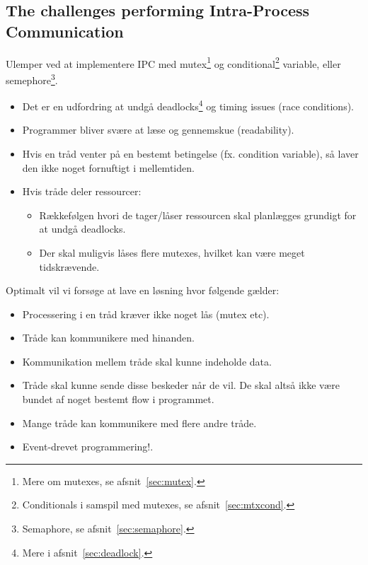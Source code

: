 \subsection{The challenges performing Intra-Process Communication}\label{sec:ipc}
Ulemper ved at implementere IPC med mutex\footnote{Mere om mutexes, se afsnit~\ref{sec:mutex}.} og conditional\footnote{Conditionals i samspil med mutexes, se afsnit~\ref{sec:mtxcond}.} variable, eller semephore\footnote{Semaphore, se afsnit~\ref{sec:semaphore}.}.

\begin{itemize}
	\item Det er en udfordring at undgå deadlocks\footnote{Mere i afsnit~\ref{sec:deadlock}.} og timing issues (race conditions).
	\item Programmer bliver svære at læse og gennemskue (readability).
	\item Hvis en tråd venter på en bestemt betingelse (fx. condition variable), så laver den ikke noget fornuftigt i mellemtiden.
	\item Hvis tråde deler ressourcer:
	\begin{itemize}
		\item Rækkefølgen hvori de tager/låser ressourcen skal planlægges grundigt for at undgå deadlocks.
		\item Der skal muligvis låses flere mutexes, hvilket kan være meget tidskrævende.
	\end{itemize}
\end{itemize}

Optimalt vil vi forsøge at lave en løsning hvor følgende gælder:

\begin{itemize}
	\item Processering i en tråd kræver ikke noget lås (mutex etc). 
	\item Tråde kan kommunikere med hinanden.
	\item Kommunikation mellem tråde skal kunne indeholde data.
	\item Tråde skal kunne sende disse beskeder når de vil. De skal altså ikke være bundet af noget bestemt flow i programmet.
	\item Mange tråde kan kommunikere med flere andre tråde.
	\item Event-drevet programmering!. 
\end{itemize}

